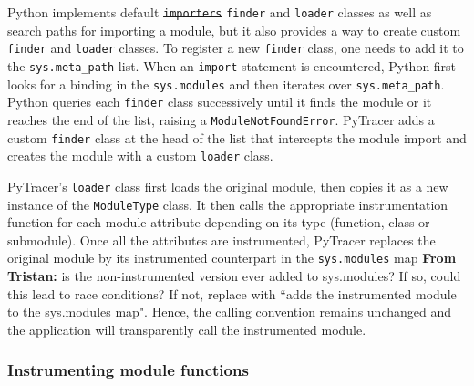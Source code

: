 \documentclass[11pt]{article}
\newcommand{\tristan}[1]{\color{orange}\textbf{From Tristan:} #1\color{black}\xspace}
\newcommand{\tristanmod}[2]{\color{orange}\sout{#1} #2\color{black}\xspace}
\newcommand{\pytracer}[0]{PyTracer\xspace}
\begin{document}
Python implements default \tristanmod{\texttt{importers}}{\texttt{finder} and \texttt{loader}} classes as well as search paths for importing a module, but it also provides a way to create custom \texttt{finder} and \texttt{loader} classes.
To register a new \texttt{finder} class, one needs to add it to the \texttt{sys.meta\_path} list.
When an \texttt{import} statement is encountered, Python first looks for a binding in the \texttt{sys.modules}
and then iterates over \texttt{sys.meta\_path}.
Python queries each \texttt{finder} class successively until it finds the module or it reaches the end of the list, raising a \texttt{ModuleNotFoundError}. \pytracer adds  a custom \texttt{finder} class at the head of the list that intercepts
the module import and creates the module with a custom \texttt{loader} class.

\pytracer's \texttt{loader} class first loads the original module, then copies it as a new instance of the \texttt{ModuleType} class.
It then calls the appropriate instrumentation function for each module attribute depending on its type (function, class or submodule). Once all the attributes are instrumented, 
\pytracer replaces the original module by its instrumented counterpart
in the \texttt{sys.modules} map \tristan{is the non-instrumented version ever added to sys.modules? If so, could this lead to race conditions? If not, replace with ``adds the instrumented module to the sys.modules map"}. Hence, the calling convention remains unchanged and the application will transparently call 
the instrumented module.


\subsubsection{Instrumenting module functions}
\end{document}
